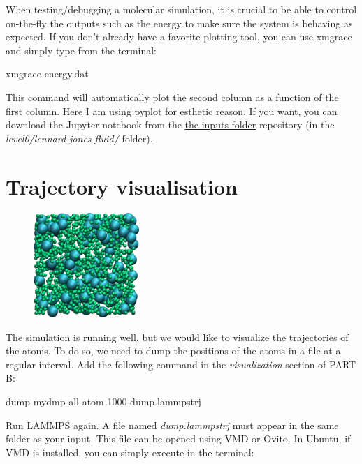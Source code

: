 \begin{tcolorbox}[colback=mylightblue!5!white,colframe=mylightblue!75!black,title=On the necessity of plotting data efficiently]
When testing/debugging a molecular simulation, it is crucial to be able to control 
on-the-fly the outputs such as the energy to make sure the
system is behaving as expected. If you don't already have 
a favorite plotting tool, you can use xmgrace and simply type from the terminal:
\begin{lcverbatim}
xmgrace energy.dat
\end{lcverbatim}

\noindent This command will automatically plot the second column as a function of the first column.
Here I am using pyplot for esthetic reason. If you want, you can download the Jupyter-notebook
from the \href{https://github.com/lammpstutorials/lammpstutorials.github.io/tree/version2.0/docs/inputs}{the inputs folder} repository (in the \textit{level0/lennard-jones-fluid/} folder).
\end{tcolorbox}

\noindent \section{Trajectory visualisation}

\hspace{-0.45cm}\begin{figure}
\includegraphics[width=4cm]{tutorials/level0/lennard-jones-fluid/input1.png}
\end{figure}

\noindent The simulation is running well, but we would like to
visualize the trajectories of the atoms. To do so, we need
to dump the positions of the atoms in a file at a regular
interval. Add the following command in the \textit{visualization}
section of PART B:

\begin{lcverbatim}
dump mydmp all atom 1000 dump.lammpstrj
\end{lcverbatim}

\noindent Run LAMMPS again. A file named \textit{dump.lammpstrj} must appear in
the same folder as your input. This file can be opened using
VMD or Ovito. In Ubuntu, if VMD is installed, you can simply
execute in the terminal:

